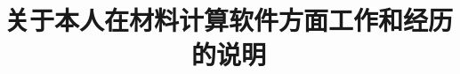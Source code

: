 \documentclass{article}      %
\begin{document}
\graphicspath{{Figures/}}
%
\renewcommand{\abstractname}{\small{\CJKfamily{hei} 摘\quad 要}} %
\renewcommand{\refname}{\centering\CJKfamily{hei} 参考文献}
\renewcommand{\figurename}{{\bf Fig}.}
\renewcommand{\tablename}{{\bf Tab}.}

\makeatletter
\long{}
\makeatother

\newcommand{\keywords}[1]{{\hspace{0\ccwd}\small{\CJKfamily{hei} 关键词:}{\hspace{2ex}{#1}}\bigskip}}



\title{关于本人在材料计算软件方面工作和经历的说明}

\maketitle
\end{document}
